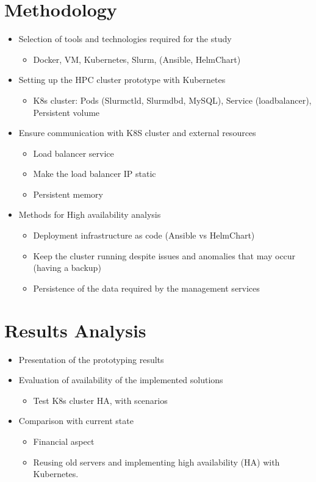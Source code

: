 \documentclass{article}
\begin{document}
\section{Methodology}
\begin{itemize}
    \item Selection of tools and technologies required for the study
        \begin{itemize}
            \item Docker, VM, Kubernetes, Slurm, (Ansible, HelmChart)
        \end{itemize}
    \item Setting up the HPC cluster prototype with Kubernetes
        \begin{itemize}
            \item K8s cluster: Pods (Slurmctld, Slurmdbd, MySQL), Service (loadbalancer), Persistent volume
        \end{itemize}
    \item Ensure communication with K8S cluster and external resources
        \begin{itemize}
            \item Load balancer service
            \item Make the load balancer IP static
            \item Persistent memory
        \end{itemize}
    \item Methods for High availability analysis
        \begin{itemize}
            \item Deployment infrastructure as code (Ansible vs HelmChart)
            \item Keep the cluster running despite issues and anomalies that may occur (having a backup)
            \item Persistence of the data required by the management services
        \end{itemize}
\end{itemize}

\section{Results Analysis}
\begin{itemize}
    \item Presentation of the prototyping results
    \item Evaluation of availability of the implemented solutions
        \begin{itemize}
            \item Test K8s cluster HA, with scenarios 
        \end{itemize}
    \item Comparison with current state
           \begin{itemize}
            \item Financial aspect
            \item Reusing old servers and implementing high availability (HA) with Kubernetes.
        \end{itemize}
\end{itemize}
\end{document}
